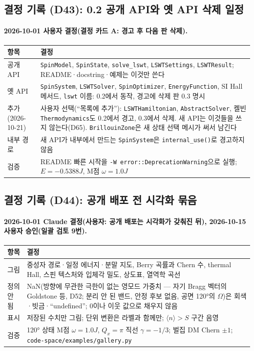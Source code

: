 \subsection{결정 기록 (D43): 0.2 공개 API와 옛 API 삭제 일정}\label{decisions-d43-api}
\begingroup%
  \framesubtitle{2026-10-01 사용자 결정(결정 카드 A: 경고 후 다음 판 삭제).}
  \small\renewcommand{\arraystretch}{1.12}
  \begin{tabularx}{\textwidth}{@{}P{3.0cm}Y@{}}
    \toprule
    항목 & 결정 \\
    \midrule
    공개 API & \texttt{SpinModel}, \texttt{SpinState}, \texttt{solve\_lswt}, \texttt{LSWTSettings}, \texttt{LSWTResult}; README·docstring·예제는 이것만 쓴다 \\
    옛 API & \texttt{SpinSystem}, \texttt{LSWTSolver}, \texttt{SpinOptimizer}, \texttt{EnergyFunction}, SI Hall 메서드, \texttt{lswt} 이름: 0.2에서 동작, 경고에 삭제 판 0.3 명시 \\
    추가 (2026-10-21) & 사용자 선택(``목록에 추가''): \texttt{LSWTHamiltonian}, \texttt{AbstractSolver}, 켈빈 \texttt{Thermodynamics}도 0.2에서 경고, 0.3에서 삭제. 새 API는 이것들을 쓰지 않는다(D65). \texttt{BrillouinZone}은 새 상태 선택 메시가 써서 남긴다 \\
    내부 경로 & 새 API가 내부에서 만드는 \texttt{SpinSystem}은 \texttt{internal\_use()}로 경고하지 않음 \\
    검증 & README 빠른 시작을 \texttt{-W error::DeprecationWarning}으로 실행; $E=-0.5388J$, M점 $\omega=1.0J$ \\
    \bottomrule
  \end{tabularx}
\endgroup


\subsection{결정 기록 (D44): 공개 배포 전 시각화 묶음}\label{decisions-d44-figures}
\begingroup%
  \framesubtitle{2026-10-01 Claude 결정(사용자: 공개 배포는 시각화가 갖춰진 뒤), 2026-10-15 사용자 승인(일괄 검토 9번).}
  \small\renewcommand{\arraystretch}{1.12}
  \begin{tabularx}{\textwidth}{@{}P{3.0cm}Y@{}}
    \toprule
    항목 & 결정 \\
    \midrule
    그림 & 중성자 경로·일정 에너지·분말 지도, Berry 곡률과 Chern 수, thermal Hall, 스핀 텍스처와 입체각 밀도, 상도표, 열역학 곡선 \\
    정의 안 됨 & NaN(방향에 무관한 극한이 없는 영모드 가중치 — 자기 Bragg 벡터의 Goldstone 등, D52; 분리 안 된 밴드, 안정 후보 없음, 공면 120°의 $\Omega$)은 회색·빗금·``undefined''; 0이나 이웃 값으로 채우지 않음 \\
    표시 & 저장된 수치만 그림; 단위 변환은 라벨과 함께만; $\langle n\rangle>S$ 구간 음영 \\
    검증 & 120° 상태 M점 $\omega=1.0J$, $Q_x=\pi$ 직선 $\gamma=-1/3$; 벌집 DM Chern $\pm1$; \texttt{code-space/examples/gallery.py} \\
    \bottomrule
  \end{tabularx}
\endgroup


